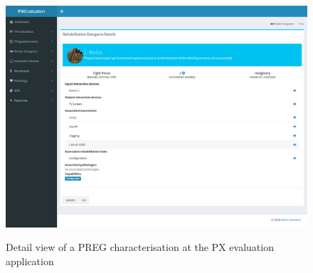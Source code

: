 \begin{figure}[bth]
\myfloatalign
{\includegraphics[width=.8\linewidth]{gfx/app/characterisingApp}} \quad
\caption{Detail view of a \ac{PREG} characterisation at the \ac{PX} evaluation application}\label{fig:characterisingApp}
\end{figure}
